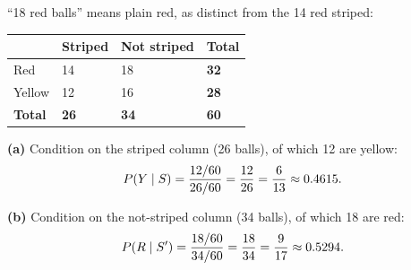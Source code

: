 \begin{solution}
``18 red balls'' means plain red, as distinct from the 14 red striped:

\begin{center}
\small\sffamily
\begin{tabular}{@{}l C{2.4cm} C{2.4cm} C{2.2cm}@{}}
\toprule
 & \textbf{Striped} & \textbf{Not striped} & \textbf{Total} \\
\midrule
Red    & 14 & 18 & \textbf{32} \\
Yellow & 12 & 16 & \textbf{28} \\
\midrule
\textbf{Total} & \textbf{26} & \textbf{34} & \textbf{60} \\
\bottomrule
\end{tabular}
\end{center}

\textbf{(a)} Condition on the striped column (26 balls), of which 12 are yellow:
\[
P\!\left(Y\mid S\right)=\frac{12/60}{26/60}=\frac{12}{26}=\frac{6}{13}\approx 0.4615 .
\]

\textbf{(b)} Condition on the not-striped column (34 balls), of which 18 are red:
\[
P\!\left(R\mid S'\right)=\frac{18/60}{34/60}=\frac{18}{34}=\frac{9}{17}\approx 0.5294 .
\]

\end{solution}

